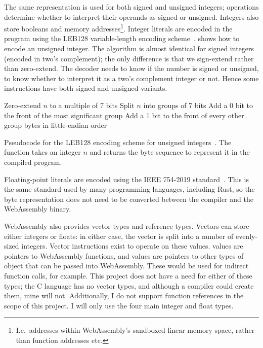 \documentclass[00-main.tex]{subfiles}
\begin{document}
The same representation is used for both signed and unsigned integers; operations determine whether to interpret their operands as signed or unsigned.
Integers also store booleans and memory addresses\footnote{I.e.\ addresses within WebAssembly's sandboxed linear memory space, rather than function addresses etc.}.
Integer literals are encoded in the program using the LEB128 variable-length encoding scheme~.
 shows how to encode an unsigned integer.
The algorithm is almost identical for signed integers (encoded in two's complement); the only difference is that we sign-extend rather than zero-extend.
The decoder needs to know if the number is signed or unsigned, to know whether to interpret it as a two's complement integer or not.
Hence some instructions have both signed and unsigned variants.

\begin{listing}[t]
  \begin{PseudocodeListing}
      \State Zero-extend $n$ to a multiple of 7 bits
      \State Split $n$ into groups of 7 bits
      \State Add a 0 bit to the front of the most significant group
      \State Add a 1 bit to the front of every other group
      \State \Return bytes in little-endian order
    \EndFunction
  \end{PseudocodeListing}
  \caption{Pseudocode for the LEB128 encoding scheme for unsigned integers~. The function takes an integer $n$ and returns the byte sequence to represent it in the compiled program.}
  \label{lst:leb128 pseudocode}
\end{listing}

Floating-point literals are encoded using the IEEE 754-2019 standard~. %
This is the same standard used by many programming languages, including Rust, so the byte representation does not need to be converted between the compiler and the WebAssembly binary.

WebAssembly also provides vector types and reference types.
Vectors can store either integers or floats: in either case, the vector is split into a number of evenly-sized integers.
Vector instructions exist to operate on these values.
 values are pointers to WebAssembly functions, and  values are pointers to other types of object that can be passed into WebAssembly. These would be used for indirect function calls, for example.
This project does not have a need for either of these types; the C language has no vector types, and although a compiler could create them, mine will not.
Additionally, I do not support function references in the scope of this project.
I will only use the four main integer and float types.
\end{document}
